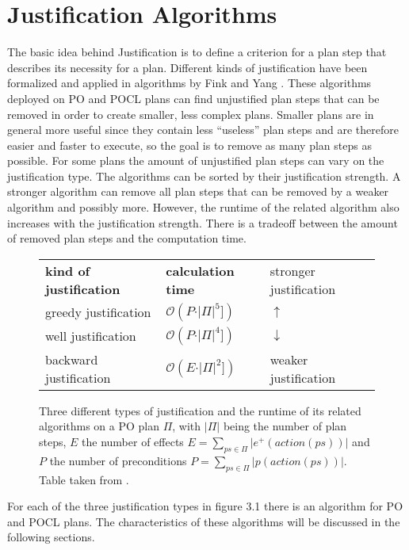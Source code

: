 \chapter{Justification Algorithms}
The basic idea behind Justification is to define a criterion for a plan step that describes its necessity for a plan. 
Different kinds of justification have been formalized and applied in algorithms by Fink and Yang
\cite{Justification}. These algorithms deployed on PO and POCL plans can find unjustified plan steps that can be removed
in order to create smaller, less complex plans. Smaller plans are in general more useful since they contain less \enquote{useless} plan steps
and are therefore easier and faster to execute, so the goal is to remove as many plan steps as possible. 
For some plans the amount of unjustified plan steps can vary on the justification type.
The algorithms can be sorted by their justification strength. A stronger algorithm can remove all plan steps that can be removed
by a weaker algorithm and possibly more. However, the runtime of the related algorithm also increases with the justification strength. 
There is a tradeoff between the amount of removed plan steps and the computation time.

\begin{figure}[h]
    \begin{tabular}{|l|l||l|}
        \hline
        \textbf{kind of justification} & \textbf{calculation time} & stronger justification\\
        \cline{1-2}
        greedy justification & $\mathcal{O}(P\cdot\vert \Pi \vert ^{5}] )$ & $\uparrow$\\
        \cline{1-2}
        well justification & $\mathcal{O}(P\cdot\vert \Pi \vert ^{4}] )$ & $\downarrow$\\
        \cline{1-2}
        backward justification &$\mathcal{O}(E\cdot\vert \Pi \vert ^{2}] )$ & weaker justification\\
        \hline
    \end{tabular}
    \caption{Three different types of justification and the runtime of its related algorithms on a PO plan $\Pi$,
    with $\vert \Pi \vert$ being the number of plan steps, $E$ the number of effects $E=\sum_{ps \in \Pi} \vert e^+(action(ps))\vert$ 
    and $P$ the number of preconditions $P=\sum_{ps \in \Pi} \vert p(action(ps))\vert$. Table taken from \cite{Justification}.}
\end{figure}
 
For each of the three justification types in figure 3.1 there is an algorithm for PO and POCL plans. The characteristics of these
algorithms will be discussed in the following sections.


